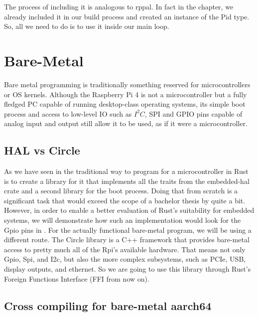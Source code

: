 The process of including it is analogous to rppal.
In fact in the  chapter,
we already included it in our build process and created an instance of the Pid type.
So, all we need to do is to use it inside our main loop.



\section{Bare-Metal}
\label{sec:concept_and_implementation:bare_metal}

Bare metal programming is traditionally something reserved for microcontrollers or OS kernels.
Although the Raspberry Pi 4 is not a microcontroller but a fully fledged PC capable of running desktop-class operating systems,
its simple boot process and access to low-level IO such as $I^2C$, SPI and GPIO pins capable of analog input and output still allow it to be used, as if it were a microcontroller.

\subsection{HAL vs Circle}
\label{sec:concept_and_implementation:bare-metal:hal}

As we have seen in  the traditional way to program for a microcontroller in Rust
is to create a library for it that implements all the traits from the embedded-hal crate and a second library for the boot process.
Doing that from scratch is a significant task that would exceed the scope of a bachelor thesis by quite a bit.
However, in order to enable a better evaluation of Rust's suitability for embedded systems, we will demonstrate how such an implementation would look for the Gpio pins in .
For the actually functional bare-metal program, we will be using a different route.
The Circle library is a C++ framework that provides bare-metal access to pretty much all of the Rpi's available hardware.
That means not only Gpio, Spi, and I2c, but also the more complex subsystems, such as PCIe, USB, display outputs, and ethernet.
So we are going to use this library through Rust's Foreign Functions Interface (FFI from now on).

\subsection{Cross compiling for bare-metal aarch64}
\label{sec:concept_and_implementation:bare-metal:cross}

